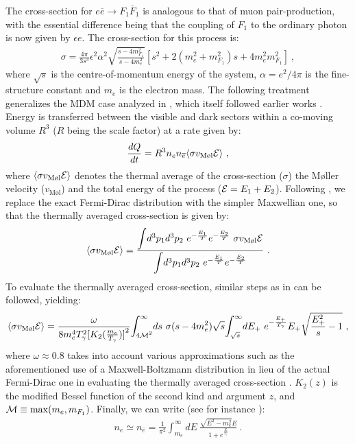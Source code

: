 \documentclass[12pt]{article}
\begin{document}
The cross-section for $e \overline{e} \rightarrow F_1 \overline{F}_1$ is
analogous to that of muon pair-production, with the essential difference
being that the coupling of $F_1$ to the ordinary photon is now given by
$\epsilon e$. The cross-section for this process is:
%
\begin{eqnarray}
\sigma = \frac{4\pi}{3s^3} \epsilon ^2 \alpha ^2 \sqrt{\frac{s - 4 m
_{F_1} ^2}{s - 4 m _{e} ^2}} \left[ 
s^2 + 2 \left (m _{e} ^2 + m _{F_1} ^2 \right )s + 4m _{e} ^2 m _{F_1}
^2 \right] \ ,
\end{eqnarray}
%
where $\sqrt{s}$ is the centre-of-momentum energy of the system, $\alpha
= e^2/4\pi$ is the fine-structure constant and $m _{e}$ is the electron
mass. The following treatment generalizes the MDM case analyzed in
\cite{predictions}, which itself followed earlier works
\cite{updated,carlson,ciarcellutiliege}. Energy is transferred between
the visible and dark sectors within a co-moving volume $R^3$ ($R$ being
the scale factor) at a rate given by:
%
\begin{eqnarray}
\frac{dQ}{dt} = R^3 n _{e} n _{\overline{e}} \langle \sigma v_{\text{M\o
l}} {\cal E} \rangle \ ,
\label{dqdt}
\end{eqnarray}
%
where $\langle \sigma v_{\text{M\o  l}} {\cal E}\rangle$ denotes the thermal
average of the cross-section ($\sigma$) the M\o ller velocity
($v_{\text{M\o l}}$) and the total energy of the process (${\cal E} = E_1 + E_2$).
Following \cite{ciarcellutiliege,gondologelmini}, we replace the exact
Fermi-Dirac distribution 
with the simpler Maxwellian one, so that the thermally averaged
cross-section is given by:
%
\begin{eqnarray}
\langle \sigma v_{\text{M\o l}} {\cal E} \rangle = \frac{\mathlarger
\int d^3p_1 d^3p_2 \ e^{-\frac{E_1}{T}} e^{-\frac{E_2}{T}} \ \sigma
v_{\text{M\o l}}{\cal E}}{\mathlarger \int d^3p_1 d^3p_2 \
e^{-\frac{E_1}{T}}e^{-\frac{E_2}{T}}} \ .
\end{eqnarray}
%
To evaluate the thermally averaged cross-section, similar steps as in
\cite{ciarcellutiliege,gondologelmini} can be followed, yielding:
%
\begin{eqnarray}
\langle \sigma v_{\text{M\o l}}{\cal E} \rangle = 
\frac{\omega}{8m_e^4 T_{\gamma}^2 {[K_2(\frac{m_e}{T_{\gamma}})]}^2}
\mathlarger \int _{4{\cal M}^2}^{\infty} ds \ \sigma (s - 4m_e^2)
\sqrt{s} \mathlarger \int _{\sqrt{s}}^{\infty} dE_+ \ e^{-\frac{E_+}{T
_{\gamma}}} E_+ \sqrt{\frac{E _+ ^2}{s} - 1} \ ,
\label{sig}
\end{eqnarray}
%
where $\omega \approx 0.8$ takes into account various approximations
such as the aforementioned use of a Maxwell-Boltzmann distribution in
lieu of the actual Fermi-Dirac one in evaluating the thermally averaged
cross-section \cite{ciarcellutiliege}. $K_2(z)$ is the modified Bessel
function of the second kind and argument $z$, and ${\cal M} \equiv
\max(m _e, m _{F_1})$. Finally, we can write (see for instance
\cite{earlyuniverse}):
%
\begin{eqnarray}
n _{e} \simeq n _{\overline{e}} = \frac{1}{\pi ^2} \int _{m_e} ^{\infty}
dE \ \frac{\sqrt{E^2 - m _e ^2}E}{1 + e^{\frac{E}{T _{\gamma}}}} \ .
\end{eqnarray}
%
\end{document}
